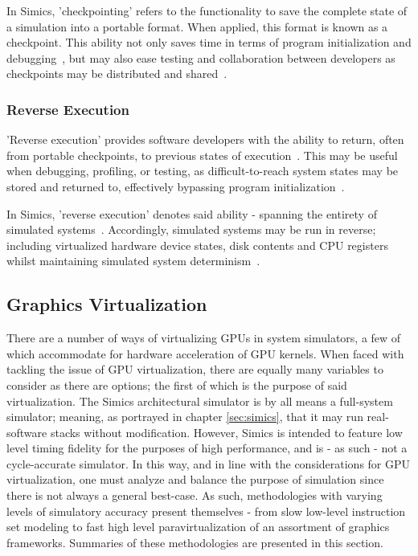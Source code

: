 In Simics, 'checkpointing' refers to the functionality to save the complete state of a simulation into a portable format.
When applied, this format is known as a checkpoint.
This ability not only  saves time in terms of program initialization and debugging~, but may also ease testing and collaboration between developers as checkpoints may be distributed and shared~.

\subsubsection{Reverse Execution}
\label{sec:simics_reverseexecution}
'Reverse execution' provides software developers with the ability to return, often from portable checkpoints, to previous states of execution~.
This may be useful when debugging, profiling, or testing, as difficult-to-reach system states may be stored and returned to, effectively bypassing program initialization~.

In Simics, 'reverse execution' denotes said ability - spanning the entirety of simulated systems~.
Accordingly, simulated systems may be run in reverse; including virtualized hardware device states, disk contents and CPU registers~ whilst maintaining simulated system determinism~.

\subsection{Graphics Virtualization}
\label{sec:backgroundandrelatedwork_graphicsvirtualization}
There are a number of ways of virtualizing GPUs in system simulators, a few of which accommodate for hardware acceleration of GPU kernels.
When faced with tackling the issue of GPU virtualization, there are equally many variables to consider as there are options; the first of which is the purpose of said virtualization.
The Simics architectural simulator is by all means a full-system simulator; meaning, as portrayed in chapter \ref{sec:simics}, that it may run real-software stacks without modification.
However, Simics is intended to feature low level timing fidelity for the purposes of high performance, and is - as such - not a cycle-accurate simulator.
In this way, and in line with the considerations for GPU virtualization, one must analyze and balance the purpose of simulation since there is not always a general best-case.
As such, methodologies with varying levels of simulatory accuracy present themselves - from slow low-level instruction set modeling to fast high level paravirtualization of an assortment of graphics frameworks.
Summaries of these methodologies are presented in this section.

